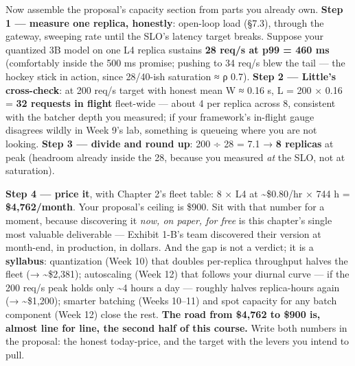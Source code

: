 Now assemble the proposal's capacity section from parts you already own. \textbf{Step 1 — measure one replica, honestly}: open-loop load (§7.3), through the gateway, sweeping rate until the SLO's latency target breaks. Suppose your quantized 3B model on one L4 replica sustains \textbf{28 req/s at p99 = 460 ms} (comfortably inside the 500 ms promise; pushing to 34 req/s blew the tail — the hockey stick in action, since 28/40-ish saturation ≈ ρ 0.7). \textbf{Step 2 — Little's cross-check}: at 200 req/s target with honest mean W ≈ 0.16 s, L = 200 × 0.16 = \textbf{32 requests in flight} fleet-wide — about 4 per replica across 8, consistent with the batcher depth you measured; if your framework's in-flight gauge disagrees wildly in Week 9's lab, something is queueing where you are not looking. \textbf{Step 3 — divide and round up}: 200 ÷ 28 = 7.1 → \textbf{8 replicas} at peak (headroom already inside the 28, because you measured \textit{at} the SLO, not at saturation).

\textbf{Step 4 — price it}, with Chapter 2's fleet table: 8 × L4 at \textasciitilde{}\$0.80/hr × 744 h = \textbf{\$4,762/month}. Your proposal's ceiling is \$900. Sit with that number for a moment, because discovering it \textit{now, on paper, for free} is this chapter's single most valuable deliverable — Exhibit 1-B's team discovered their version at month-end, in production, in dollars. And the gap is not a verdict; it is a \textbf{syllabus}: quantization (Week 10) that doubles per-replica throughput halves the fleet (→ \textasciitilde{}\$2,381); autoscaling (Week 12) that follows your diurnal curve — if the 200 req/s peak holds only \textasciitilde{}4 hours a day — roughly halves replica-hours again (→ \textasciitilde{}\$1,200); smarter batching (Weeks 10–11) and spot capacity for any batch component (Week 12) close the rest. \textbf{The road from \$4,762 to \$900 is, almost line for line, the second half of this course.} Write both numbers in the proposal: the honest today-price, and the target with the levers you intend to pull.


